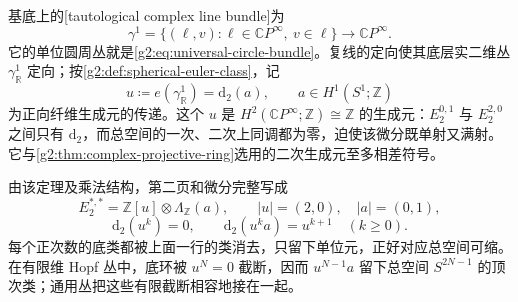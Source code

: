 \ProseParagraphBreak

基底上的[tautological complex line bundle]为
\[
	\gamma^1=\{(\ell,v):\ell\in\mathbb CP^\infty,\ v\in\ell\}\longrightarrow\mathbb CP^\infty.
\]
它的单位圆周丛就是\eqref{g2:eq:universal-circle-bundle}。复线的定向使其底层实二维丛 \(\gamma^1_{\mathbb R}\) 定向；按\cref{g2:def:spherical-euler-class}，记
\[
	u\coloneqq e(\gamma^1_{\mathbb R})=\mathrm d_2(a),\qquad a\in H^1(S^1;\mathbb Z)
\]
为正向纤维生成元的传递。这个 \(u\) 是 \(H^2(\mathbb CP^\infty;\mathbb Z)\cong\mathbb Z\) 的生成元：\(E_2^{0,1}\) 与 \(E_2^{2,0}\) 之间只有 \(\mathrm d_2\)，而总空间的一次、二次上同调都为零，迫使该微分既单射又满射。它与\cref{g2:thm:complex-projective-ring}选用的二次生成元至多相差符号。

\ProseParagraphBreak

由该定理及乘法结构，第二页和微分完整写成
\[
	E_2^{*,*}=\mathbb Z[u]\otimes\Lambda_{\mathbb Z}(a),\qquad |u|=(2,0),\quad |a|=(0,1),
\]
\[
	\mathrm d_2(u^k)=0,\qquad \mathrm d_2(u^ka)=u^{k+1}\quad(k\ge0).
\]
每个正次数的底类都被上面一行的类消去，只留下单位元，正好对应总空间可缩。在有限维 Hopf 丛中，底环被 \(u^{N}=0\) 截断，因而 \(u^{N-1}a\) 留下总空间 \(S^{2N-1}\) 的顶次类；通用丛把这些有限截断相容地接在一起。

